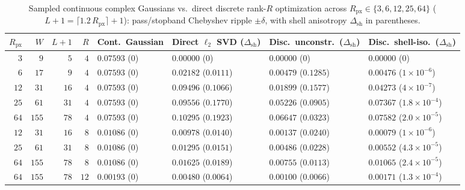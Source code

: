 \documentclass[11pt,a4paper]{article}
\theoremstyle{plain}
\theoremstyle{definition}
\begin{document}
\begin{table}[h]
\centering
\caption{Sampled continuous complex Gaussians vs.\ direct discrete rank-$R$ optimization across $R_{\mathrm{px}} \in \{3, 6, 12, 25, 64\}$ ($L + 1 = \lceil 1.2\,R_{\mathrm{px}}\rceil + 1$): pass/stopband Chebyshev ripple $\pm\delta$, with shell anisotropy $\Delta_{\mathrm{sh}}$ in parentheses.}\label{tab:disc_vs_cont}
\smallskip
{\scriptsize\setlength{\tabcolsep}{2.8pt}
\begin{tabular}{@{}rrrrllll@{}}
\toprule
$R_{\mathrm{px}}$ & $W$ & $L{+}1$ & $R$ & Cont.\ Gaussian & Direct $\ell_2$ SVD ($\Delta_{\mathrm{sh}}$) & Disc.\ unconstr.\ ($\Delta_{\mathrm{sh}}$) & Disc.\ shell-iso.\ ($\Delta_{\mathrm{sh}}$) \\
\midrule
$3$ & $9$ & $5$ & $4$ & $0.07593$ ($0$) & $0.00000$ ($0$) & $0.00000$ ($0$) & $0.00000$ ($0$) \\
$6$ & $17$ & $9$ & $4$ & $0.07593$ ($0$) & $0.02182$ ($0.0111$) & $0.00479$ ($0.1285$) & $0.00476$ ($1{\times}10^{-6}$) \\
$12$ & $31$ & $16$ & $4$ & $0.07593$ ($0$) & $0.09496$ ($0.1066$) & $0.01899$ ($0.1577$) & $0.04273$ ($4{\times}10^{-7}$) \\
$25$ & $61$ & $31$ & $4$ & $0.07593$ ($0$) & $0.09556$ ($0.1770$) & $0.05226$ ($0.0905$) & $0.07367$ ($1.8{\times}10^{-4}$) \\
$64$ & $155$ & $78$ & $4$ & $0.07593$ ($0$) & $0.10295$ ($0.1923$) & $0.06647$ ($0.0323$) & $0.07582$ ($2.0{\times}10^{-5}$) \\
\midrule
$12$ & $31$ & $16$ & $8$ & $0.01086$ ($0$) & $0.00978$ ($0.0140$) & $0.00137$ ($0.0240$) & $0.00079$ ($1{\times}10^{-6}$) \\
$25$ & $61$ & $31$ & $8$ & $0.01086$ ($0$) & $0.01295$ ($0.0151$) & $0.00486$ ($0.0228$) & $0.00552$ ($4.3{\times}10^{-5}$) \\
$64$ & $155$ & $78$ & $8$ & $0.01086$ ($0$) & $0.01625$ ($0.0189$) & $0.00755$ ($0.0113$) & $0.01065$ ($2.4{\times}10^{-5}$) \\
$64$ & $155$ & $78$ & $12$ & $0.00193$ ($0$) & $0.00480$ ($0.0064$) & $0.00100$ ($0.0066$) & $0.00171$ ($1.3{\times}10^{-4}$) \\
\bottomrule
\end{tabular}}
\end{table}
\end{document}

